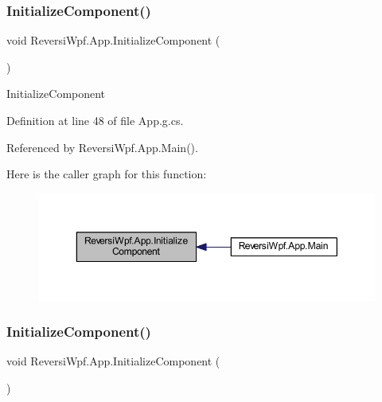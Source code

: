 \subsubsection{\texorpdfstring{Initialize\+Component()}{InitializeComponent()}\hspace{0.1cm}{\footnotesize\ttfamily [1/4]}}
{\footnotesize\ttfamily void Reversi\+Wpf.\+App.\+Initialize\+Component (\begin{DoxyParamCaption}{ }\end{DoxyParamCaption})}



Initialize\+Component 



Definition at line 48 of file App.\+g.\+cs.



Referenced by Reversi\+Wpf.\+App.\+Main().

Here is the caller graph for this function\+:
\nopagebreak
\begin{figure}[H]
\begin{center}
\leavevmode
\includegraphics[width=350pt]{class_reversi_wpf_1_1_app_a30ccf063a596c89bd03747d60a96d084_icgraph}
\end{center}
\end{figure}
\mbox{\label{class_reversi_wpf_1_1_app_a30ccf063a596c89bd03747d60a96d084}} 
\subsubsection{\texorpdfstring{Initialize\+Component()}{InitializeComponent()}\hspace{0.1cm}{\footnotesize\ttfamily [2/4]}}
{\footnotesize\ttfamily void Reversi\+Wpf.\+App.\+Initialize\+Component (\begin{DoxyParamCaption}{ }\end{DoxyParamCaption})}



